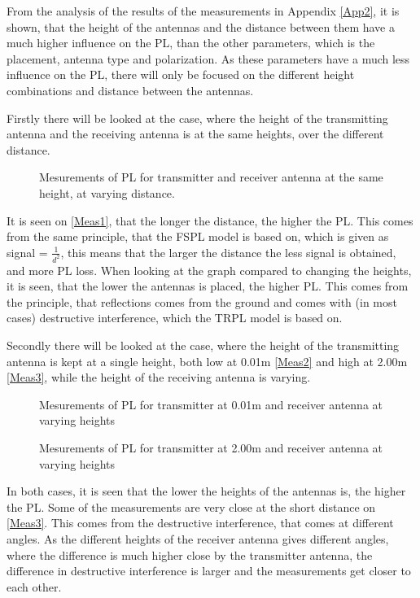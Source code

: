 From the analysis of the results of the measurements in Appendix \autoref{App2}, it is shown, that the height of the antennas and the distance between them have a much higher influence on the PL, than the other parameters, which is the placement, antenna type and polarization. As these parameters have a much less influence on the PL, there will only be focused on the different height combinations and distance between the antennas.

Firstly there will be looked at the case, where the height of the transmitting antenna and the receiving antenna is at the same heights, over the different distance.

\begin{figure}[!htbp]
\centering

\caption{Mesurements of PL for transmitter and receiver antenna at the same height, at varying distance.}
\label{Meas1}
\end{figure}

It is seen on \autoref{Meas1}, that the longer the distance, the higher the PL. This comes from the same principle, that the FSPL model is based on, which is given as signal = $\frac{1}{d^{2}}$, this means that the larger the distance the less signal is obtained, and more PL loss. When looking at the graph compared to changing the heights, it is seen, that the lower the antennas is placed, the higher PL. This comes from the principle, that reflections comes from the ground and comes with (in most cases) destructive interference, which the TRPL model is based on. 

Secondly there will be looked at the case, where the height of the transmitting antenna is kept at a single height, both low at 0.01m \autoref{Meas2} and high at 2.00m \autoref{Meas3}, while the height of the receiving antenna is varying.

\begin{figure}[!htbp]
\centering

\caption{Mesurements of PL for transmitter at 0.01m and receiver antenna at varying heights}
\label{Meas2}
\end{figure}

\begin{figure}[!htbp]
\centering

\caption{Mesurements of PL for transmitter at 2.00m and receiver antenna at varying heights}
\label{Meas3}
\end{figure}

In both cases, it is seen that the lower the heights of the antennas is, the higher the PL. Some of the measurements are very close at the short distance on \autoref{Meas3}. This comes from the destructive interference, that comes at different angles. As the different heights of the receiver antenna gives different angles, where the difference is much higher close by the transmitter antenna, the difference in destructive interference is larger and the measurements get closer to each other.

